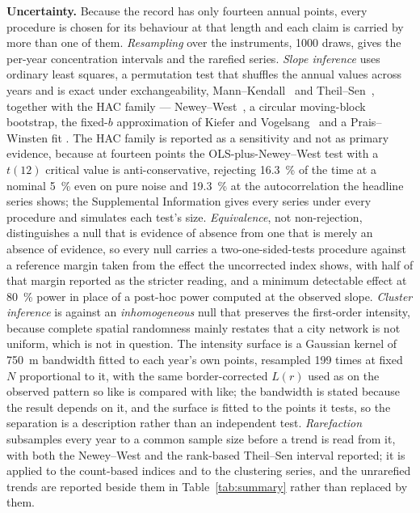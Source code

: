 \documentclass[fleqn,10pt,lineno]{wlpeerj}
\newcommand{\nwSize}{16.3}
\newcommand{\nwSizeAr}{19.3}
\begin{document}
\noindent\textbf{Uncertainty.} Because the record has only fourteen annual points, every
procedure is chosen for its behaviour at that length and each claim is carried by more than one
of them. \emph{Resampling} \citep{efron1979bootstrap} over the instruments, 1000 draws, gives the
per-year concentration intervals and the rarefied series. \emph{Slope inference} uses ordinary
least squares, a permutation test that shuffles the annual values across years and is exact under
exchangeability, Mann--Kendall~\citeyearpar{mann1945nonparametric} and Theil--Sen~\citeyearpar{sen1968estimates}, together with the HAC family --- Newey--West~\citeyearpar{newey1987simple}, a circular moving-block bootstrap, the fixed-$b$ approximation of Kiefer
and Vogelsang~\citeyearpar{kiefer2005simple} and a Prais--Winsten fit \citep{prais1954trend}. The HAC
family is reported as a sensitivity and not as primary evidence, because at fourteen points
the OLS-plus-Newey--West test with a $t(12)$ critical value is anti-conservative, rejecting
\SI{\nwSize}{\percent} of the time at a nominal \SI{5}{\percent} even on pure noise and
\SI{\nwSizeAr}{\percent} at the autocorrelation the headline series shows;
the Supplemental Information gives every series under every procedure and simulates each test's
size. \emph{Equivalence}, not non-rejection, distinguishes a null that is evidence of
absence from one that is merely an absence of evidence, so every null carries a two-one-sided-tests
procedure \citep{schuirmann1987comparison,lakens2018equivalence} against a reference margin taken
from the effect the uncorrected index shows, with half of that margin reported as the stricter
reading, and a minimum detectable effect at \SI{80}{\percent} power in place of a post-hoc power
computed at the observed slope. \emph{Cluster inference} is against an
\emph{inhomogeneous} null that preserves the first-order intensity, because complete spatial
randomness mainly restates that a city network is not uniform, which is not in question. The
intensity surface is a Gaussian kernel of \SI{750}{\meter} bandwidth fitted to each year's own
points, resampled \num{199} times at fixed $N$ proportional to it, with the same border-corrected
$L(r)$ used as on the observed pattern so like is compared with like; the bandwidth is stated
because the result depends on it, and the surface is fitted to the points it tests, so the
separation is a description rather than an independent test.
\emph{Rarefaction} subsamples every year to a common sample size before a trend is read from it,
with both the Newey--West and the rank-based Theil--Sen interval reported; it is applied to the
count-based indices and to the clustering series, and the unrarefied trends are reported beside
them in Table~\ref{tab:summary} rather than replaced by them.
\end{document}

